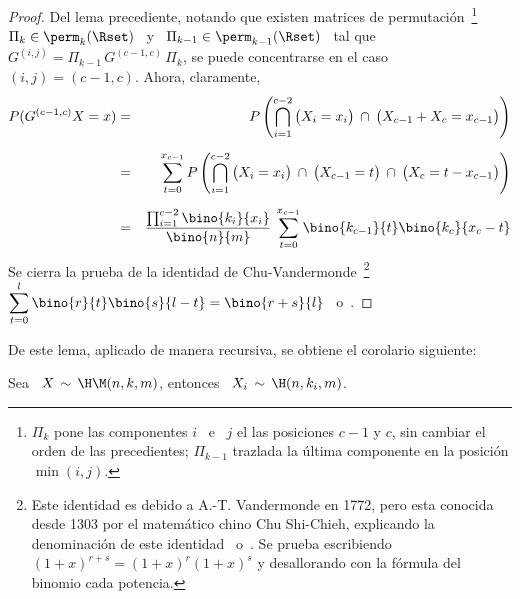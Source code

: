 %
\begin{proof}
 Del  lema precediente,
  notando  que  existen  matrices  de permutaci\'on~\footnote{$\Pi_k$  pone  las
    componentes $i$ \ e \ $j$ el  las posiciones $c-1$ y $c$, sin cambiar el orden
    de  las  precedientes;  $\Pi_{k-1}$  trazlada  la  \'ultima  componente  en  la
    posici\'on $\min(i,j)$.}  \ $\Pi_k \in  \perm_k(\Rset)$ \ y \ $\Pi_{k-1} \in
  \perm_{k-1}(\Rset)$ \ tal que \ $G^{(i,j)} = \Pi_{k-1} \, G^{(c-1,c)} \, \Pi_k$,
  se puede concentrarse en el caso \ $(i,j) = (c-1,c)$. Ahora, claramente,
  \begin{eqnarray*}
  P(G^{(c-1,c)} X = x) & = & \displaystyle P\left( \bigcap_{i=1}^{c-2} \big( X_i = x_i \big)
  \: \cap \: \big( X_{c-1} + X_c = x_{c-1} \big) \right)\\[2mm]
  & = & \displaystyle \sum_{t=0}^{x_{c-1}} P\left( \bigcap_{i=1}^{c-2} \big( X_i = x_i \big)
  \: \cap \: \big( X_{c-1} = t\big) \: \cap \: \big( X_c = t-x_{c-1} \big) \right)\\[2mm]
  & = & \frac{\prod_{i=1}^{c-2} \bino{k_i}{x_i}}{\bino{n}{m}}
  \: \sum_{t=0}^{x_{c-1}} \bino{k_{c-1}}{t}\bino{k_c}{x_c-t}
  \end{eqnarray*}
  Se  cierra  la  prueba   de  la  identidad  de  Chu-Vandermonde~\footnote{Este
    identidad es  debido a A.-T. Vandermonde  en 1772, pero  esta conocida desde
    1303 por  el matem\'atico chino Chu Shi-Chieh,  explicando la denominaci\'on
    de  este   identidad~\cite{AndLar94}  o~\cite[p.~59-60]{Ask75}.   Se  prueba
    escribiendo $(1+x)^{r+s} = (1+x)^r  (1+x)^s$ y desallorando con la f\'ormula
    del     binomio    cada     potencia.}      $\displaystyle    \sum_{t=0}^{l}
  \bino{r}{t}\bino{s}{l-t}   =  \bino{r+s}{l}$~\cite[Ec.~(21),  p.~59]{Knu97_v1}
  o~\cite[Ec.~0.156]{GraRyz15}.
\end{proof}

De este lema, aplicado de manera recursiva, se obtiene el corolario siguiente:
%
\begin{corolario}\label{Cor:MP:MarginalMultinomial}
%
  Sea  \ $X  \,  \sim \,  \H\M(n,k,m)$, entonces  \  $\displaystyle X_i  \, \sim  \,
  \H(n,k_i,m)$.
\end{corolario}


